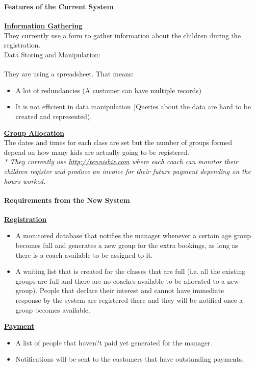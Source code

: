 \documentclass{l3proj}
\begin{document}
\textbf{\Large{Features of the Current System}}\\
\\\textbf{\underline{Information Gathering}}\\
They currently use a form to gather information about the children during the registration.\\
Data Storing and Manipulation:\\
\\They are using a spreadsheet. That means:\\
\begin{itemize}
	\item A lot of redundancies (A customer can have multiple records)
	\item It is not efficient in data manipulation (Queries about the data are hard to be created and represented).
\end{itemize}
\textbf{\underline{Group Allocation}}\\
The dates and times for each class are set but the number of groups formed depend on how many kids are actually going to be registered.\\
\emph{* They currently use \url{http://tennisbiz.com} where each coach can monitor their children register and produce an invoice for their future payment depending on the hours worked.}\\
\\ \textbf{\Large{Requirements from the New System}}\\
\\ \textbf{\underline{Registration}}
	\begin{itemize}
		\item A monitored database that notifies the manager whenever a certain age group becomes full and generates a new group for the extra bookings, as long as there is a coach available to be assigned to it.
		\item A waiting list that is created for the classes that are full (i.e. all the existing groups are full and there are no coaches available to be allocated to a new group). People that declare their interest and cannot have immediate response by the system are registered there and they will be notified once a group becomes available.
	\end{itemize}
\textbf{\underline{Payment}}
	\begin{itemize}
	\item A list of people that haven?t paid yet generated for the manager.
	\item Notifications will be sent to the customers that have outstanding payments.
	\end{itemize}
\end{document}
